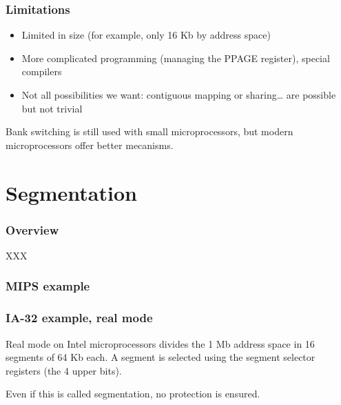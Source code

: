 
\begin{frame}
  \frametitle{Limitations}

  \begin{itemize}
  \item
    Limited in size (for example, only 16 Kb by address space)
  \item
    More complicated programming (managing the PPAGE register),
    special compilers
  \item
    Not all possibilities we want: contiguous mapping or
    sharing\ldots{} are possible but not trivial
  \end{itemize}

  \-

  Bank switching is still used with small microprocessors, but modern
  microprocessors offer better mecanisms.

\end{frame}

%
%

\section{Segmentation}


\begin{frame}
  \frametitle{Overview}

  XXX

\end{frame}


\begin{frame}
  \frametitle{MIPS example}

  \begin{center}
  \end{center}

\end{frame}


\begin{frame}
  \frametitle{IA-32 example, real mode}

  Real mode on Intel microprocessors divides the 1 Mb address space in
  16 segments of 64 Kb each. A segment is selected using the segment
  selector registers (the 4 upper bits).

  \-

  Even if this is called segmentation, no protection is ensured.

\end{frame}

